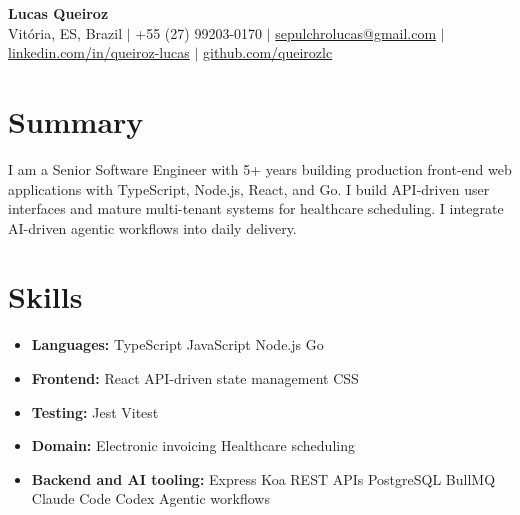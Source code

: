 \documentclass[letterpaper,10pt]{article}
\newcommand{\resumeItem}[1]{\item\small{#1}}
\newcommand{\resumeSubHeadingList}{\begin{itemize}[leftmargin=0.15in, label={}, nosep]}
\newcommand{\resumeSubHeadingListEnd}{\end{itemize}}
\begin{document}
\begin{center}
  \textbf{\Huge Lucas Queiroz} \\[3pt]
  \small Vit\'oria, ES, Brazil $|$ +55 (27) 99203-0170 $|$ \href{mailto:sepulchrolucas@gmail.com}{sepulchrolucas@gmail.com} $|$
  \href{https://linkedin.com/in/queiroz-lucas}{linkedin.com/in/queiroz-lucas} $|$
  \href{https://github.com/queirozlc}{github.com/queirozlc}
\end{center}
\vspace{2pt}

\section{Summary}
I am a Senior Software Engineer with 5+ years building production front-end web applications with TypeScript, Node.js, React, and Go. I build API-driven user interfaces and mature multi-tenant systems for healthcare scheduling. I integrate AI-driven agentic workflows into daily delivery.

\section{Skills}
\resumeSubHeadingList
\resumeItem{\textbf{Languages:} TypeScript \textbar{} JavaScript \textbar{} Node.js \textbar{} Go}
\resumeItem{\textbf{Frontend:} React \textbar{} API-driven state management \textbar{} CSS}
\resumeItem{\textbf{Testing:} Jest \textbar{} Vitest}
\resumeItem{\textbf{Domain:} Electronic invoicing \textbar{} Healthcare scheduling}
\resumeItem{\textbf{Backend and AI tooling:} Express \textbar{} Koa \textbar{} REST APIs \textbar{} PostgreSQL \textbar{} BullMQ \textbar{} Claude Code \textbar{} Codex \textbar{} Agentic workflows}
\resumeSubHeadingListEnd
\end{document}
